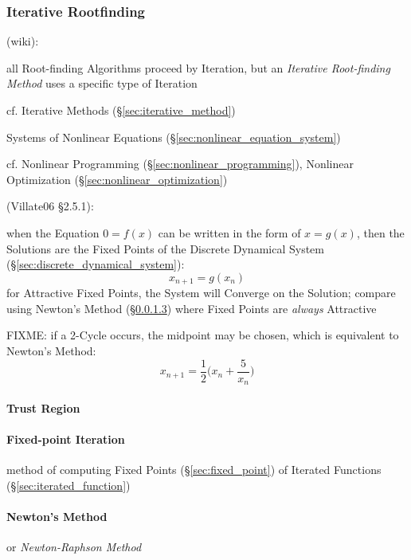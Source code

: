 \subsubsection{Iterative Rootfinding}\label{sec:iterative_rootfinding}

(wiki):

all Root-finding Algorithms proceed by Iteration, but an \emph{Iterative
  Root-finding Method} uses a specific type of Iteration

\fist cf. Iterative Methods (\S\ref{sec:iterative_method})

\fist Systems of Nonlinear Equations
(\S\ref{sec:nonlinear_equation_system})

\fist cf. Nonlinear Programming (\S\ref{sec:nonlinear_programming}), Nonlinear
Optimization (\S\ref{sec:nonlinear_optimization})

(Villate06 \S 2.5.1):

when the Equation $0 = f(x)$ can be written in the form of $x = g(x)$, then the
Solutions are the Fixed Points of the Discrete Dynamical System
(\S\ref{sec:discrete_dynamical_system}):
\[
  x_{n+1} = g(x_n)
\]
for Attractive Fixed Points, the System will Converge on the Solution; compare
using Newton's Method (\S\ref{sec:newtons_method}) where Fixed Points are
\emph{always} Attractive

FIXME:
if a 2-Cycle occurs, the midpoint may be chosen, which is equivalent to Newton's
Method:
\[
  x_{n+1} = \frac{1}{2}\big(x_n + \frac{5}{x_n}\big)
\]



\paragraph{Trust Region}\label{sec:trust_region}\hfill

\paragraph{Fixed-point Iteration}\label{sec:fixedpoint_iteration}\hfill

method of computing Fixed Points (\S\ref{sec:fixed_point}) of Iterated Functions
(\S\ref{sec:iterated_function})



\paragraph{Newton's Method}\label{sec:newtons_method}\hfill

or \emph{Newton-Raphson Method}

